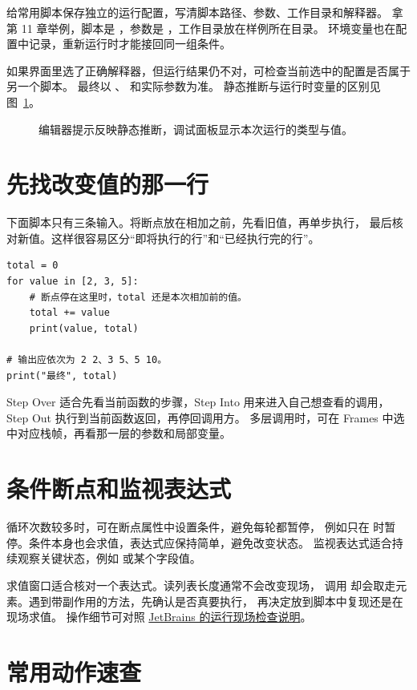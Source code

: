 给常用脚本保存独立的运行配置，写清脚本路径、参数、工作目录和解释器。
拿第 11 章举例，脚本是 ，参数是
，工作目录放在样例所在目录。
环境变量也在配置中记录，重新运行时才能接回同一组条件。

如果界面里选了正确解释器，但运行结果仍不对，可检查当前选中的配置是否属于另一个脚本。
最终以 、 和实际参数为准。
静态推断与运行时变量的区别见图~\ref{fig:appendix-ide}。
\begin{figure}[htbp]
  \centering
  \caption{编辑器提示反映静态推断，调试面板显示本次运行的类型与值。}
  \label{fig:appendix-ide}
\end{figure}

\section{先找改变值的那一行}

下面脚本只有三条输入。将断点放在相加之前，先看旧值，再单步执行，
最后核对新值。这样很容易区分“即将执行的行”和“已经执行完的行”。
\begin{lstlisting}[title={\code{debug_total.py}}]
total = 0
for value in [2, 3, 5]:
    # 断点停在这里时，total 还是本次相加前的值。
    total += value
    print(value, total)

# 输出应依次为 2 2、3 5、5 10。
print("最终", total)
\end{lstlisting}

Step Over 适合先看当前函数的步骤，Step Into 用来进入自己想查看的调用，
Step Out 执行到当前函数返回，再停回调用方。
多层调用时，可在 Frames 中选中对应栈帧，再看那一层的参数和局部变量。

\section{条件断点和监视表达式}

循环次数较多时，可在断点属性中设置条件，避免每轮都暂停，
例如只在  时暂停。条件本身也会求值，表达式应保持简单，避免改变状态。
监视表达式适合持续观察关键状态，例如  或某个字段值。

求值窗口适合核对一个表达式。读列表长度通常不会改变现场，
调用  却会取走元素。遇到带副作用的方法，先确认是否真要执行，
再决定放到脚本中复现还是在现场求值。
操作细节可对照
\href{https://www.jetbrains.com/help/pycharm/examining-suspended-program.html}{JetBrains 的运行现场检查说明}。

\section{常用动作速查}

